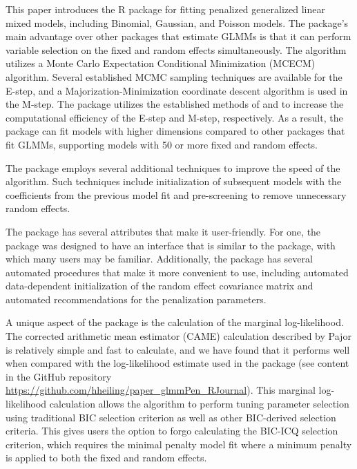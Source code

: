 This paper introduces the R package  for fitting
penalized generalized linear mixed models, including Binomial,
Gaussian, and Poisson models. The  package's main advantage over other packages that estimate GLMMs is that it can perform
variable selection on the fixed and random effects simultaneously. The algorithm utilizes a Monte Carlo Expectation Conditional Minimization (MCECM) algorithm. Several
established MCMC sampling techniques are available for the E-step, and a
Majorization-Minimization coordinate descent algorithm is used in the
M-step. The package utilizes the established methods of  and
 to increase the computational efficiency of the
E-step and M-step, respectively. As a result, the  package
can fit models with higher dimensions compared to other packages that
fit GLMMs, supporting models with 50 or more
fixed and random effects. 

The  package employs several additional techniques to improve the speed of the algorithm. Such techniques include initialization of subsequent models with the
coefficients from the previous model fit and pre-screening to remove
unnecessary random effects.

The  package has several attributes that make it user-friendly. For one, the package was designed to have an interface that is similar to the  package, with which many users may be familiar. Additionally, the 
package has several automated procedures that make it more convenient to use, including automated data-dependent initialization
of the random effect covariance matrix and
automated recommendations for the penalization parameters.

A unique aspect of the package is the calculation of the marginal
log-likelihood. The corrected arithmetic mean estimator (CAME)
calculation described by Pajor \citep{pajor2017} is relatively simple and fast to calculate, and we have found that it performs well when compared with the log-likelihood estimate used in the  package (see content in the GitHub repository \url{https://github.com/hheiling/paper_glmmPen_RJournal}).
This marginal log-likelihood calculation allows the algorithm to perform tuning parameter selection using traditional BIC selection criterion as well as other BIC-derived selection criteria. This gives users the option to forgo calculating the BIC-ICQ selection criterion, which requires the minimal penalty model fit where a minimum penalty is applied to both the fixed and random effects.

